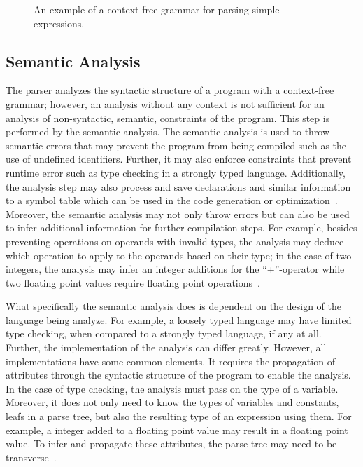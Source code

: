 \begin{figure}[htp]
    \centering
    
    \caption{An example of a context-free grammar for parsing simple expressions.}
    \label{fig:example_parser}
\end{figure}


\subsection{Semantic Analysis}
\label{sec:background_semanticalAnalysis}
The parser analyzes the syntactic structure of a program with a context-free grammar; however, an analysis without any context is not sufficient for an analysis of non-syntactic, \ie semantic, constraints of the program. This step is performed by the semantic analysis. The semantic analysis is used to throw semantic errors that may prevent the program from being compiled such as the use of undefined identifiers. Further, it may also enforce constraints that prevent runtime error such as type checking in a strongly typed language. Additionally, the analysis step may also process and save declarations and similar information to a symbol table which can be used in the code generation or optimization~\cite{Oliv07, SWW*88}. Moreover, the semantic analysis may not only throw errors but can also be used to infer additional information for further compilation steps. For example, besides preventing operations on operands with invalid types, the analysis may deduce which operation to apply to the operands based on their type; in the case of two integers, the analysis may infer an integer additions for the ``+''-operator while two floating point values require floating point operations~\cite{Wait74,VSSD07}.

What specifically the semantic analysis does is dependent on the design of the language being analyze. For example, a loosely typed language may have limited type checking, when compared to a strongly typed language, if any at all. Further, the implementation of the analysis can differ greatly. However, all implementations have some common elements. It requires the propagation of attributes through the syntactic structure of the program to enable the analysis. In the case of type checking, the analysis must pass on the type of a variable. Moreover, it does not only need to know the types of variables and constants, \ie leafs in a parse tree, but also the resulting type of an expression using them. For example, a integer added to a floating point value may result in a floating point value. To infer and propagate these attributes, the parse tree may need to be transverse~\cite{Wait74,VSSD07}.

